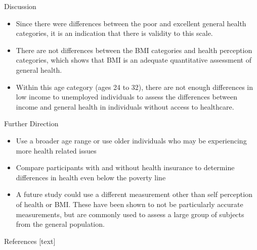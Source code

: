 \documentclass[final]{beamer}\usepackage[]{graphicx}\usepackage[]{color}
\begin{document}
\begin{frame}[fragile]
\begin{columns}[t]
\begin{column}{0.31\linewidth}
\begin{minipage}[t][.955\textheight]{\linewidth}
\begin{block}{Discussion}
\begin{itemize}
\item Since there were differences between the poor and excellent general health categories, it is an indication that there is validity to this scale. 
\item There are not differences between the BMI categories and health perception categories, which shows that BMI is an adequate quantitative assessment of general health.
\item Within this age category (ages 24 to 32), there are not enough differences in low income to unemployed individuals to assess the differences between income and general health in individuals without access to healthcare. 
\end{itemize}
\vspace{0ex}
\vfill
\end{block}
\vfill

\vspace{0ex}
\begin{block}{Further Direction}
\vspace{0ex}
\begin{itemize}
\item Use a broader age range or use older individuals who may be experiencing more health related issues
\item Compare participants with and without health insurance to determine differences in health even below the poverty line
\item A future study could use a different measurement other than self perception of health or BMI. These have been shown to not be particularly accurate measurements, but are commonly used to assess a large group of subjects from the general population.
\end{itemize}
\vspace{1ex}
\vfill
\end{block}
\vfill

\begin{block}{References}
\footnotesize
{}[text]
\vspace{-1ex}



\normalsize
\vfill
\end{block} 
\vfill

\end{minipage}
\end{column}%




\end{columns}
\end{frame}
\end{document}
